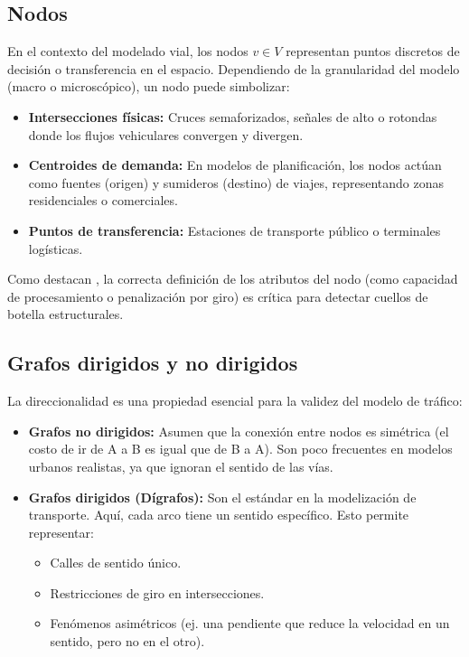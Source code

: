\subsection{Nodos}
En el contexto del modelado vial, los nodos $v \in V$ representan puntos discretos de decisión o transferencia en el espacio. Dependiendo de la granularidad del modelo 
(macro o microscópico), un nodo puede simbolizar:

\begin{itemize}
    \item \textbf{Intersecciones físicas:} Cruces semaforizados, señales de alto o rotondas donde los flujos vehiculares convergen y divergen.
    \item \textbf{Centroides de demanda:} En modelos de planificación, los nodos actúan como fuentes (origen) y sumideros (destino) de viajes, representando zonas residenciales 
    o comerciales.
    \item \textbf{Puntos de transferencia:} Estaciones de transporte público o terminales logísticas.
\end{itemize}

Como destacan \cite{musmade_study_2024} , la correcta definición de los atributos del nodo (como capacidad de procesamiento o penalización por giro) es crítica para detectar cuellos de 
botella estructurales.

\subsection{Grafos dirigidos y no dirigidos}
La direccionalidad es una propiedad esencial para la validez del modelo de tráfico:

\begin{itemize}
    \item \textbf{Grafos no dirigidos:} Asumen que la conexión entre nodos es simétrica (el costo de ir de A a B es igual que de B a A). Son poco frecuentes en modelos 
    urbanos realistas, ya que ignoran el sentido de las vías.
    \item \textbf{Grafos dirigidos (Dígrafos):} Son el estándar en la modelización de transporte. Aquí, cada arco tiene un sentido específico. Esto permite representar:
    \begin{itemize}
        \item Calles de sentido único.
        \item Restricciones de giro en intersecciones.
        \item Fenómenos asimétricos (ej. una pendiente que reduce la velocidad en un sentido, pero no en el otro).
    \end{itemize}
\end{itemize}

